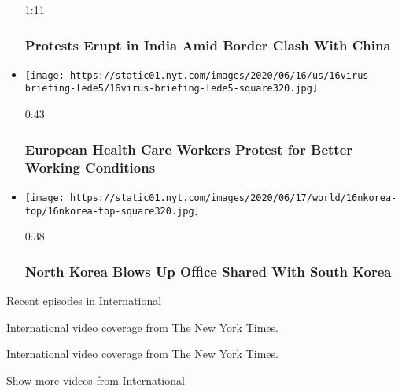 \begin{itemize}
  1:11

  \hypertarget{protests-erupt-in-india-amid-border-clash-with-china}{%
  \subsubsection{Protests Erupt in India Amid Border Clash With
  China}\label{protests-erupt-in-india-amid-border-clash-with-china}}
\item
  \href{https://www.nytimes.com/video/us/100000007194473/european-health-care-workers-protest-for-better-working-conditions.html?action=click\&module=video-series-bar\&region=header\&pgtype=Article\&playlistId=video/world}{}

  \texttt{[image: https://static01.nyt.com/images/2020/06/16/us/16virus-briefing-lede5/16virus-briefing-lede5-square320.jpg]}

  0:43

  \hypertarget{european-health-care-workers-protest-for-better-working-conditions}{%
  \subsubsection{European Health Care Workers Protest for Better Working
  Conditions}\label{european-health-care-workers-protest-for-better-working-conditions}}
\item
  \href{https://www.nytimes.com/video/world/asia/100000007193762/north-korea-blows-office-south-korea.html?action=click\&module=video-series-bar\&region=header\&pgtype=Article\&playlistId=video/world}{}

  \texttt{[image: https://static01.nyt.com/images/2020/06/17/world/16nkorea-top/16nkorea-top-square320.jpg]}

  0:38

  \hypertarget{north-korea-blows-up-office-shared-with-south-korea}{%
  \subsubsection{North Korea Blows Up Office Shared With South
  Korea}\label{north-korea-blows-up-office-shared-with-south-korea}}
\end{itemize}

Recent episodes in International

International video coverage from The New York Times.

International video coverage from The New York Times.

Show more videos from International

